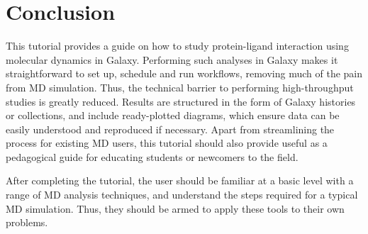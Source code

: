 \documentclass[twocolumn]{bmcart}%
\begin{document}
\hypertarget{conclusion}{%
\section*{Conclusion}\label{conclusion}}

This tutorial provides a guide on how to study protein-ligand interaction using molecular dynamics in Galaxy. Performing such analyses in Galaxy makes it straightforward to set up, schedule and run workflows, removing much of the pain from MD simulation. Thus, the technical barrier to performing high-throughput studies is greatly reduced. Results are structured in the form of Galaxy histories or collections, and include ready-plotted diagrams, which ensure data can be easily understood and reproduced if necessary. Apart from streamlining the process for existing MD users, this tutorial should also provide useful as a pedagogical guide for educating students or newcomers to the field.

After completing the tutorial, the user should be familiar at a basic level with a range of MD analysis techniques, and understand the steps required for a typical MD simulation. Thus, they should be armed to apply these tools to their own problems.



\end{document}
